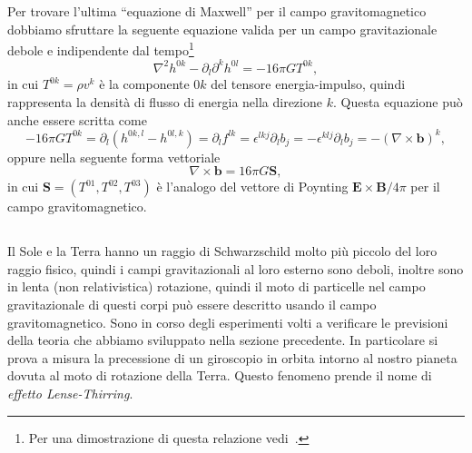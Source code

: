 Per trovare l'ultima ``equazione di Maxwell'' per il campo gravitomagnetico
dobbiamo sfruttare la seguente equazione valida per un campo gravitazionale
debole e indipendente dal
tempo\footnote{Per una dimostrazione di questa relazione
  vedi~\textcite[139]{ohanian:gravitazione}.}
\begin{equation}
  \nabla^{2}h^{0k} - \partial_{l}\partial^{k} h^{0l} = -16\pi GT^{0k},
\end{equation}
in cui $T^{0k} = \rho v^{k}$ è la componente $0k$ del tensore energia-impulso,
quindi rappresenta la densità di flusso di energia nella direzione $k$.  Questa
equazione può anche essere scritta come
\begin{equation}
  -16\pi GT^{0k} = \partial_{l}(h^{0k,l} - h^{0l,k}) = \partial_{l}f^{lk} =
  \epsilon^{lkj}\partial_{l}b_{j} = -\epsilon^{klj}\partial_{l}b_{j} = -(\nabla
  \times \bm{b})^{k},
\end{equation}
oppure nella seguente forma vettoriale
\begin{equation}
  \nabla \times \bm{b} = 16\pi G \bm{S},
\end{equation}
in cui $\bm{S} = (T^{01}, T^{02}, T^{03})$ è l'analogo del
vettore di Poynting $\bm{E}\times\bm{B}/4\pi$ per il
campo gravitomagnetico.

\subsection{}
\label{sec:effetto-lense-thirring}

Il Sole e la Terra hanno un raggio di Schwarzschild molto più piccolo del loro
raggio fisico, quindi i campi gravitazionali al loro esterno sono deboli,
inoltre sono in lenta (non relativistica) rotazione, quindi il moto di
particelle nel campo gravitazionale di questi corpi può essere descritto usando
il campo gravitomagnetico.  Sono in corso degli esperimenti volti a verificare
le previsioni della teoria che abbiamo sviluppato nella sezione precedente.  In
particolare si prova a misura la precessione di un giroscopio in orbita intorno
al nostro pianeta dovuta al moto di rotazione della Terra.  Questo fenomeno
prende il nome di \emph{effetto Lense-Thirring}.

